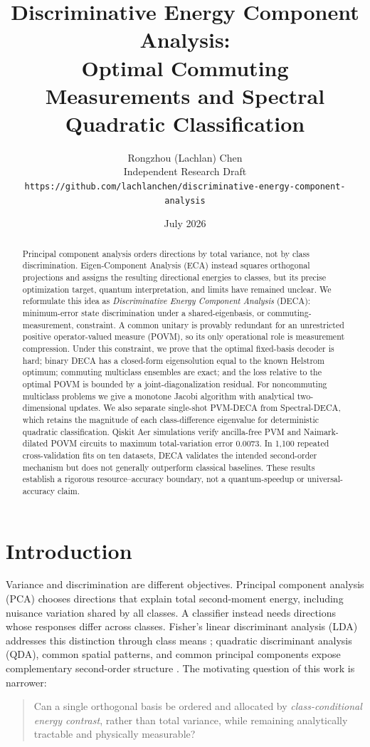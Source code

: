 \documentclass[10pt,twocolumn]{article}
\title{\textbf{Discriminative Energy Component Analysis:}\\
Optimal Commuting Measurements and Spectral Quadratic Classification}
\author{Rongzhou (Lachlan) Chen\\
\small Independent Research Draft\\
\small \texttt{https://github.com/lachlanchen/discriminative-energy-component-analysis}}
\date{July 2026}
\theoremstyle{definition}
\theoremstyle{remark}
\begin{document}
\maketitle

\begin{abstract}
Principal component analysis orders directions by total variance, not by
class discrimination.  Eigen-Component Analysis (ECA) instead squares
orthogonal projections and assigns the resulting directional energies to
classes, but its precise optimization target, quantum interpretation, and
limits have remained unclear.  We reformulate this idea as
\emph{Discriminative Energy Component Analysis} (DECA): minimum-error state
discrimination under a shared-eigenbasis, or commuting-measurement,
constraint.  A common unitary is provably redundant for an unrestricted
positive operator-valued measure (POVM), so its only operational role is
measurement compression.  Under this constraint, we prove that the optimal
fixed-basis decoder is hard; binary DECA has a closed-form eigensolution equal
to the known Helstrom optimum; commuting multiclass ensembles are exact; and
the loss relative to the optimal POVM is bounded by a joint-diagonalization
residual.  For noncommuting multiclass problems we give a monotone Jacobi
algorithm with analytical two-dimensional updates.  We also separate
single-shot PVM-DECA from Spectral-DECA, which retains the magnitude of each
class-difference eigenvalue for deterministic quadratic classification.
Qiskit Aer simulations verify ancilla-free PVM and Naimark-dilated POVM
circuits to maximum total-variation error $0.0073$.  In 1,100 repeated
cross-validation fits on ten datasets, DECA validates the intended
second-order mechanism but does not generally outperform classical
baselines.  These results establish a rigorous resource--accuracy boundary,
not a quantum-speedup or universal-accuracy claim.
\end{abstract}

\section{Introduction}
\label{sec:introduction}

Variance and discrimination are different objectives.  Principal component
analysis (PCA) chooses directions that explain total second-moment energy,
including nuisance variation shared by all classes.  A classifier instead
needs directions whose responses differ across classes.  Fisher's linear
discriminant analysis (LDA) addresses this distinction through class means
\cite{fisher1936}; quadratic discriminant analysis (QDA), common spatial
patterns, and common principal components expose complementary second-order
structure \cite{friedman1989,flury1984,ramoser2000}.  The motivating question
of this work is narrower:
\begin{quote}
Can a single orthogonal basis be ordered and allocated by
\emph{class-conditional energy contrast}, rather than total variance, while
remaining analytically tractable and physically measurable?
\end{quote}
\end{document}
